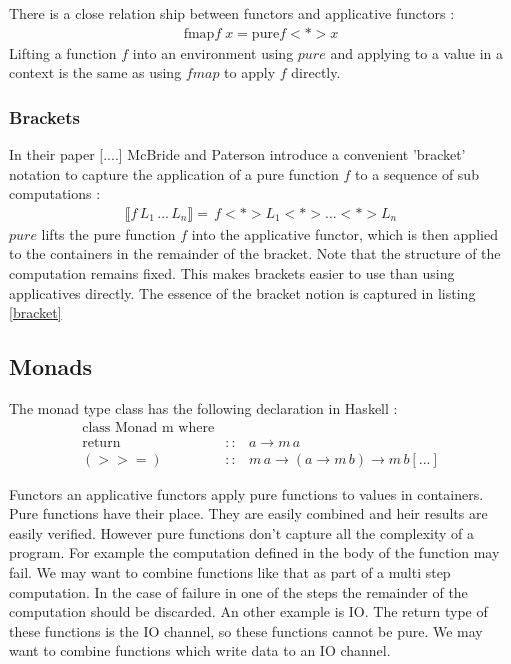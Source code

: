 \documentclass[12pt,fleqn]{article}
\begin{document}
There is a close relation ship between functors and applicative functors :
\begin{eqnarray*}
  \mbox{fmap} f \; x = \mbox{pure} f <*> x
\end{eqnarray*} 
Lifting a function $f$ into an environment using $pure$ and applying to a value in a context is the same as using $fmap$ to apply $f$ directly.

%
%
%
\subsubsection{Brackets}
%
%

In their paper [....] McBride and Paterson introduce a convenient 'bracket' notation to capture the application of a pure function $f$ 
to a sequence of sub computations :
\begin{eqnarray*}
 \llbracket f\, L_{1}\, ...\, L_{n} \rrbracket  =  \, f <*> L_{1} <*>...<*> L_{n}
\end{eqnarray*}
$pure$ lifts the pure function $f$ into the applicative functor, which is then applied to the containers in the remainder of the bracket. 
Note that the structure of the computation remains fixed.
This makes brackets easier to use than using applicatives directly.
The essence of the bracket notion is captured in listing \ref{bracket}

%
%
%
\subsection{Monads}
%
%


The monad type class has the following declaration in Haskell :
\begin{eqnarray*}
\mbox{class Monad m where} \\
\mbox{return} &::& a \rightarrow m \, a \\
(>>=) &::& m \, a \rightarrow ( a \rightarrow m \, b) \rightarrow m \, b
[...] 
\end{eqnarray*}

Functors an applicative functors apply pure functions to values in containers.
Pure functions have their place. 
They are easily combined and heir results are easily verified.
However pure functions don't capture all the complexity of a program.
For example the computation defined in the body of the function may fail.
We may want to combine functions like that as part of a multi step computation. 
In the case of failure in one of the steps the remainder of the computation should be discarded.
An other example is IO.
The return type of these functions is the IO channel, so these functions cannot be pure.
We may want to combine functions which write data to an IO channel.
\end{document}
